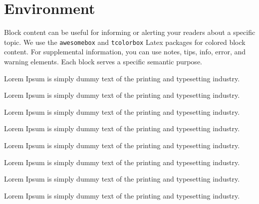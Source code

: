 \documentclass[
]{book}
\newenvironment{rmdThink}{
	\vspace*{0.5\baselineskip}
    \par\noindent
    \begin{tcolorbox}[enhanced, title={\textbf{\color{white}Think}},colback=MPIGreen!10!white, colframe=MPIGreen]
    \itshape
}{
    \end{tcolorbox}
    \par\ignorespacesafterend
}
\newenvironment{rmdNote}{
	\vspace*{0.5\baselineskip}
    \par\noindent
    \begin{tcolorbox}[enhanced, title={\textbf{\color{white}Note}},colback=MPIRed!10!white, colframe=MPIRed]
    \itshape
}{
    \end{tcolorbox}
    \par\ignorespacesafterend
}
\newenvironment{rmdTip}{
	\vspace*{0.5\baselineskip}
    \par\noindent
    \begin{tcolorbox}[enhanced, title={\textbf{\color{white}Tip}},colback=MPILightGreen!10!white, colframe=MPILightGreen]
    \itshape
}{
    \end{tcolorbox}
    \par\ignorespacesafterend
}
\newenvironment{rmdWarning}{
	\vspace*{0.5\baselineskip}
    \par\noindent
    \begin{tcolorbox}[enhanced, title={\textbf{\color{white}Warning}},colback=MPIOrange!10!white, colframe=MPIOrange]
    \itshape
}{
    \end{tcolorbox}
    \par\ignorespacesafterend
}
\begin{document}
\hypertarget{environment}{%
\chapter{Environment}\label{environment}}

Block content can be useful for informing or alerting your readers about a specific topic.
We use the \texttt{awesomebox} and \texttt{tcolorbox} Latex packages for colored block content.
For supplemental information, you can use notes, tips, info, error, and warning elements. Each block serves a specific semantic purpose.

\begin{rmdNote}
Lorem Ipsum is simply dummy text of the printing and typesetting industry.

\end{rmdNote}

\begin{rmdnote}
Lorem Ipsum is simply dummy text of the printing and typesetting industry.

\end{rmdnote}

\begin{rmdTip}
Lorem Ipsum is simply dummy text of the printing and typesetting industry.

\end{rmdTip}

\begin{rmdtip}
Lorem Ipsum is simply dummy text of the printing and typesetting industry.

\end{rmdtip}

\begin{rmdThink}
Lorem Ipsum is simply dummy text of the printing and typesetting industry.

\end{rmdThink}

\begin{rmdthink}
Lorem Ipsum is simply dummy text of the printing and typesetting industry.

\end{rmdthink}

\begin{rmdWarning}
Lorem Ipsum is simply dummy text of the printing and typesetting industry.

\end{rmdWarning}

\begin{rmdwarning}
Lorem Ipsum is simply dummy text of the printing and typesetting industry.

\end{rmdwarning}
\end{document}

